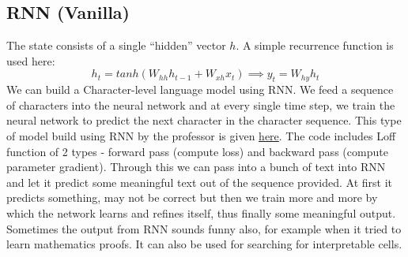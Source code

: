 \documentclass[12pt,a4paper]{article}
\begin{document}
\subsection{RNN (Vanilla)}
The state consists of a single ``hidden'' vector $h$. A simple recurrence function is used here:
\begin{equation*}
  h_t = tanh(W_{hh}h_{t-1} + W_{xh}x_t)  \implies y_t = W_{hy}h_t
\end{equation*}
We can build a Character-level language model using RNN. We feed a sequence of characters into the neural network and at every single time step, we train the neural network to predict the next character in the character sequence. This type of model build using RNN by the professor is given \href{https://gist.github.com/karpathy/d4dee566867f8291f086}{here}. The code includes Loff function of 2 types - forward pass (compute loss) and backward pass (compute parameter gradient). Through this we can pass into a bunch of text into RNN and let it predict some meaningful text out of the sequence provided. At first it predicts something, may not be correct but then we train more and more by which the network learns and refines itself, thus finally some meaningful output. Sometimes the output from RNN sounds funny also, for example when it tried to learn mathematics proofs. It can also be used for searching for interpretable cells.
\end{document}
